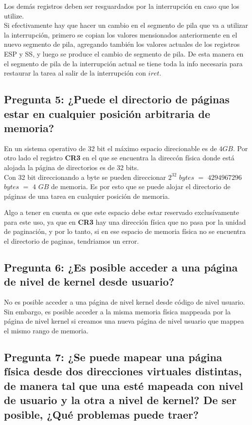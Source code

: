 \documentclass[a4paper,10pt,twoside]{article}
\begin{document}
Los demás registros deben ser resguardados por la interrupción en caso que los utilize.\\

Si efectivamente hay que hacer un cambio en el segmento de pila que va a utilizar la interrupción, primero se copian los valores mensionados anteriormente en el nuevo segmento de pila, agregando también los valores actuales de  los registros ESP y SS, y luego se produce el cambio de segmento de pila. De esta manera en el segmento de pila de la interrupción actual se tiene toda la info necesaria para restaurar la tarea al salir de la interrupción con $iret$.


\subsection{Pregunta 5: ¿Puede el directorio de páginas estar en cualquier posición arbitraria de memoria?}
En un sistema operativo de 32 bit el máximo espacio direcionable es de $4GB$. Por otro lado el registro \textbf{CR3} en el que se encuentra la direccón física donde está alojada la página de directorios es de 32 bits. \\

Con 32 bit direccionando a byte se pueden direccionar $2^{32}$ $bytes$ $=$ $4294967296$ $bytes$ $=$ $4$ $GB$ de memoria. Es por esto que se puede alojar el directorio de páginas de una tarea en cualquier posición de memoria. 

Algo a tener en cuenta es que este espacio debe estar reservado exclusívamente para este uso, ya que en \textbf{CR3} hay una dirección física que no pasa por la unidad de paginación, y por lo tanto, si en ese espacio de memoria física no se encuentra el directorio de paginas, tendriamos un error.


\subsection{Pregunta 6: ¿Es posible acceder a una página de nivel de kernel desde usuario?}

No es posible acceder a una página de nivel kernel desde código de nivel usuario. Sin embargo, es posible acceder a la misma memoria física mappeada por la página de nivel kernel si creamos una nueva página de nivel usuario que mappea el mismo rango de memoria.


\subsection{Pregunta 7: ¿Se puede mapear una página física desde dos direcciones virtuales distintas, de manera tal que una esté mapeada con nivel de usuario y la otra a nivel de kernel? De ser posible, ¿Qué problemas puede traer?}
\end{document}
